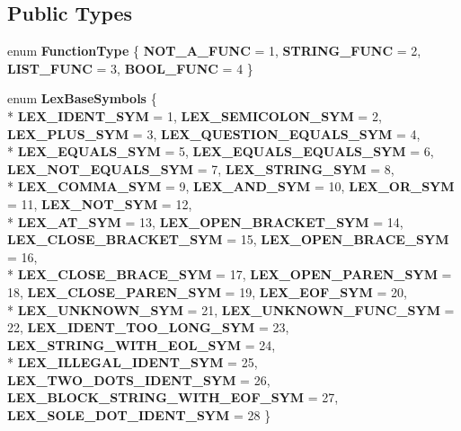 \subsection*{Public Types}
\begin{DoxyCompactItemize}
\item 
enum {\bfseries Function\-Type} \{ {\bfseries N\-O\-T\-\_\-\-A\-\_\-\-F\-U\-N\-C} = 1, 
{\bfseries S\-T\-R\-I\-N\-G\-\_\-\-F\-U\-N\-C} = 2, 
{\bfseries L\-I\-S\-T\-\_\-\-F\-U\-N\-C} = 3, 
{\bfseries B\-O\-O\-L\-\_\-\-F\-U\-N\-C} = 4
 \}
\item 
enum {\bfseries Lex\-Base\-Symbols} \{ \\*
{\bfseries L\-E\-X\-\_\-\-I\-D\-E\-N\-T\-\_\-\-S\-Y\-M} = 1, 
{\bfseries L\-E\-X\-\_\-\-S\-E\-M\-I\-C\-O\-L\-O\-N\-\_\-\-S\-Y\-M} = 2, 
{\bfseries L\-E\-X\-\_\-\-P\-L\-U\-S\-\_\-\-S\-Y\-M} = 3, 
{\bfseries L\-E\-X\-\_\-\-Q\-U\-E\-S\-T\-I\-O\-N\-\_\-\-E\-Q\-U\-A\-L\-S\-\_\-\-S\-Y\-M} = 4, 
\\*
{\bfseries L\-E\-X\-\_\-\-E\-Q\-U\-A\-L\-S\-\_\-\-S\-Y\-M} = 5, 
{\bfseries L\-E\-X\-\_\-\-E\-Q\-U\-A\-L\-S\-\_\-\-E\-Q\-U\-A\-L\-S\-\_\-\-S\-Y\-M} = 6, 
{\bfseries L\-E\-X\-\_\-\-N\-O\-T\-\_\-\-E\-Q\-U\-A\-L\-S\-\_\-\-S\-Y\-M} = 7, 
{\bfseries L\-E\-X\-\_\-\-S\-T\-R\-I\-N\-G\-\_\-\-S\-Y\-M} = 8, 
\\*
{\bfseries L\-E\-X\-\_\-\-C\-O\-M\-M\-A\-\_\-\-S\-Y\-M} = 9, 
{\bfseries L\-E\-X\-\_\-\-A\-N\-D\-\_\-\-S\-Y\-M} = 10, 
{\bfseries L\-E\-X\-\_\-\-O\-R\-\_\-\-S\-Y\-M} = 11, 
{\bfseries L\-E\-X\-\_\-\-N\-O\-T\-\_\-\-S\-Y\-M} = 12, 
\\*
{\bfseries L\-E\-X\-\_\-\-A\-T\-\_\-\-S\-Y\-M} = 13, 
{\bfseries L\-E\-X\-\_\-\-O\-P\-E\-N\-\_\-\-B\-R\-A\-C\-K\-E\-T\-\_\-\-S\-Y\-M} = 14, 
{\bfseries L\-E\-X\-\_\-\-C\-L\-O\-S\-E\-\_\-\-B\-R\-A\-C\-K\-E\-T\-\_\-\-S\-Y\-M} = 15, 
{\bfseries L\-E\-X\-\_\-\-O\-P\-E\-N\-\_\-\-B\-R\-A\-C\-E\-\_\-\-S\-Y\-M} = 16, 
\\*
{\bfseries L\-E\-X\-\_\-\-C\-L\-O\-S\-E\-\_\-\-B\-R\-A\-C\-E\-\_\-\-S\-Y\-M} = 17, 
{\bfseries L\-E\-X\-\_\-\-O\-P\-E\-N\-\_\-\-P\-A\-R\-E\-N\-\_\-\-S\-Y\-M} = 18, 
{\bfseries L\-E\-X\-\_\-\-C\-L\-O\-S\-E\-\_\-\-P\-A\-R\-E\-N\-\_\-\-S\-Y\-M} = 19, 
{\bfseries L\-E\-X\-\_\-\-E\-O\-F\-\_\-\-S\-Y\-M} = 20, 
\\*
{\bfseries L\-E\-X\-\_\-\-U\-N\-K\-N\-O\-W\-N\-\_\-\-S\-Y\-M} = 21, 
{\bfseries L\-E\-X\-\_\-\-U\-N\-K\-N\-O\-W\-N\-\_\-\-F\-U\-N\-C\-\_\-\-S\-Y\-M} = 22, 
{\bfseries L\-E\-X\-\_\-\-I\-D\-E\-N\-T\-\_\-\-T\-O\-O\-\_\-\-L\-O\-N\-G\-\_\-\-S\-Y\-M} = 23, 
{\bfseries L\-E\-X\-\_\-\-S\-T\-R\-I\-N\-G\-\_\-\-W\-I\-T\-H\-\_\-\-E\-O\-L\-\_\-\-S\-Y\-M} = 24, 
\\*
{\bfseries L\-E\-X\-\_\-\-I\-L\-L\-E\-G\-A\-L\-\_\-\-I\-D\-E\-N\-T\-\_\-\-S\-Y\-M} = 25, 
{\bfseries L\-E\-X\-\_\-\-T\-W\-O\-\_\-\-D\-O\-T\-S\-\_\-\-I\-D\-E\-N\-T\-\_\-\-S\-Y\-M} = 26, 
{\bfseries L\-E\-X\-\_\-\-B\-L\-O\-C\-K\-\_\-\-S\-T\-R\-I\-N\-G\-\_\-\-W\-I\-T\-H\-\_\-\-E\-O\-F\-\_\-\-S\-Y\-M} = 27, 
{\bfseries L\-E\-X\-\_\-\-S\-O\-L\-E\-\_\-\-D\-O\-T\-\_\-\-I\-D\-E\-N\-T\-\_\-\-S\-Y\-M} = 28
 \}
\end{DoxyCompactItemize}
